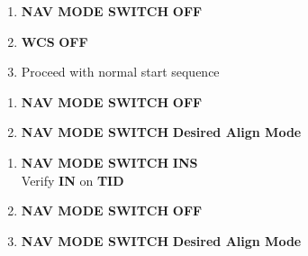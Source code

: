 \documentclass[fontInter]{TechCheck}
\begin{document}
\begin{listlongtable}
		\begin{minipage}[t]{\linewidth}
			\begin{enumerate}
				\item \textbf{NAV MODE SWITCH} \dotfill \textbf{OFF}
				\item \textbf{WCS} \dotfill \textbf{OFF}
				\item Proceed with normal start sequence
			\end{enumerate}
			\begin{enumerate}
				\item \textbf{NAV MODE SWITCH} \dotfill \textbf{OFF}
				\item \textbf{NAV MODE SWITCH} \dotfill \textbf{Desired Align Mode}
			\end{enumerate}
			\begin{enumerate}
				\item \textbf{NAV MODE SWITCH} \dotfill \textbf{INS} \\
				\hfill Verify \textbf{IN} on \textbf{TID}
				\item \textbf{NAV MODE SWITCH} \dotfill \textbf{OFF}
				\item \textbf{NAV MODE SWITCH} \dotfill \textbf{Desired Align Mode}
			\end{enumerate}
		\end{minipage} \\
	\end{listlongtable}

\end{document}
